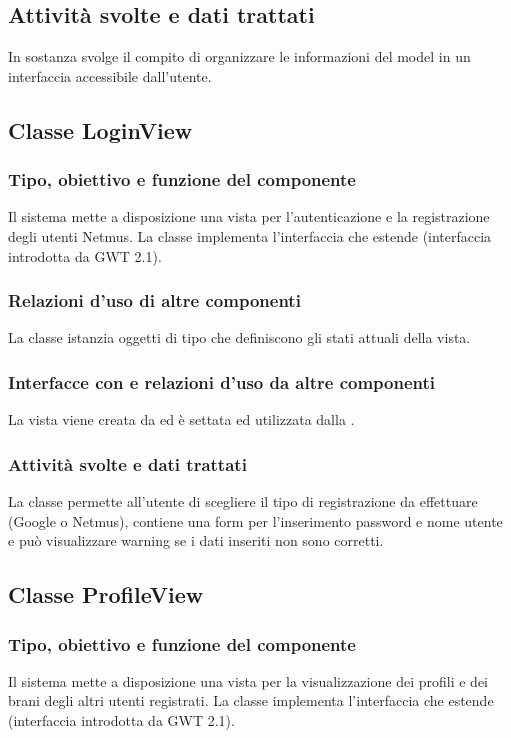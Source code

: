 \subsection*{Attivit\`a svolte e dati trattati}
In sostanza svolge il compito di organizzare le informazioni del model in un
interfaccia accessibile dall'utente.

\subsection{Classe LoginView}
\subsubsection*{Tipo, obiettivo e funzione del componente}
Il sistema mette a disposizione una vista per l'autenticazione e la
registrazione degli utenti Netmus. La classe 
implementa l'interfaccia  che estende 
(interfaccia introdotta da GWT 2.1).
\subsubsection*{Relazioni d'uso di altre componenti}
La classe istanzia oggetti di tipo  che definiscono gli stati
attuali della vista.
\subsubsection*{Interfacce con e relazioni d'uso da altre componenti}
La vista viene creata da  ed \`e settata ed utilizzata dalla
.
\subsubsection*{Attivit\`a svolte e dati trattati}
La classe permette all'utente di scegliere il tipo di registrazione da
effettuare (Google o Netmus), contiene una form per l'inserimento password e
nome utente e pu\`o visualizzare warning se i dati inseriti non sono corretti.

\subsection{Classe ProfileView}
\subsubsection*{Tipo, obiettivo e funzione del componente}
Il sistema mette a disposizione una vista per la visualizzazione dei profili e
dei brani degli altri utenti registrati. La classe 
implementa l'interfaccia  che estende 
(interfaccia introdotta da GWT 2.1).
